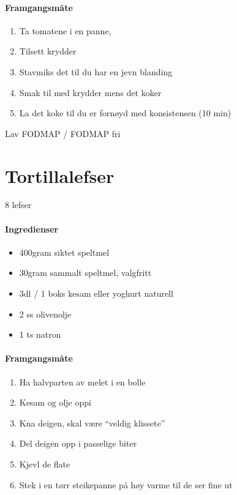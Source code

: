 \documentclass[12pt,a4paper]{book}
\begin{document}
\paragraph{Framgangsmåte}
\begin{enumerate}[noitemsep]
	\item Ta tomatene i en panne,
	\item Tilsett krydder
	\item Stavmiks det til du har en jevn blanding
	\item Smak til med krydder mens det koker
	\item La det koke til du er fornøyd med konsistensen (10 min)

\end{enumerate}

Lav FODMAP / FODMAP fri
\clearpage{}
\clearpage{}\section{﻿Tortillalefser}
\label{tortillalefser}
8 lefser

\paragraph{Ingredienser}
\begin{itemize}[noitemsep]
	\item 400gram siktet speltmel
	\item 30gram sammalt speltmel, valgfritt
	\item 3dl / 1 boks kesam eller yoghurt naturell
	\item 2 ss olivenolje
	\item 1 ts natron
\end{itemize}

\paragraph{Framgangsmåte}
\begin{enumerate}[noitemsep]
	\item Ha halvparten av melet i en bolle
	\item Kesam og olje oppi
	\item Kna deigen, skal være “veldig klissete”
	\item Del deigen opp i passelige biter
	\item Kjevl de flate
	\item Stek i en tørr steikepanne på høy varme til de ser fine ut
\end{enumerate}
\end{document}

